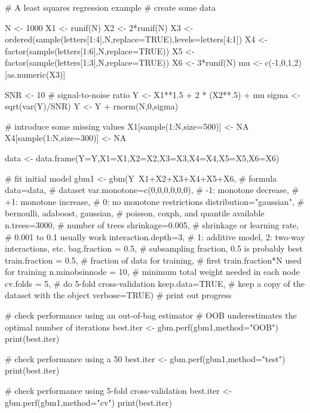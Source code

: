 \begin{Examples}
\begin{ExampleCode}
# A least squares regression example
# create some data

N <- 1000
X1 <- runif(N)
X2 <- 2*runif(N)
X3 <- ordered(sample(letters[1:4],N,replace=TRUE),levels=letters[4:1])
X4 <- factor(sample(letters[1:6],N,replace=TRUE))
X5 <- factor(sample(letters[1:3],N,replace=TRUE))
X6 <- 3*runif(N)
mu <- c(-1,0,1,2)[as.numeric(X3)]

SNR <- 10 # signal-to-noise ratio
Y <- X1**1.5 + 2 * (X2**.5) + mu
sigma <- sqrt(var(Y)/SNR)
Y <- Y + rnorm(N,0,sigma)

# introduce some missing values
X1[sample(1:N,size=500)] <- NA
X4[sample(1:N,size=300)] <- NA

data <- data.frame(Y=Y,X1=X1,X2=X2,X3=X3,X4=X4,X5=X5,X6=X6)

# fit initial model
gbm1 <- gbm(Y~X1+X2+X3+X4+X5+X6,         # formula
    data=data,                   # dataset
    var.monotone=c(0,0,0,0,0,0), # -1: monotone decrease,
                                 # +1: monotone increase,
                                 #  0: no monotone restrictions
    distribution="gaussian",     # bernoulli, adaboost, gaussian,
                                 # poisson, coxph, and quantile available
    n.trees=3000,                # number of trees
    shrinkage=0.005,             # shrinkage or learning rate,
                                 # 0.001 to 0.1 usually work
    interaction.depth=3,         # 1: additive model, 2: two-way interactions, etc.
    bag.fraction = 0.5,          # subsampling fraction, 0.5 is probably best
    train.fraction = 0.5,        # fraction of data for training,
                                 # first train.fraction*N used for training
    n.minobsinnode = 10,         # minimum total weight needed in each node
    cv.folds = 5,                # do 5-fold cross-validation
    keep.data=TRUE,              # keep a copy of the dataset with the object
    verbose=TRUE)                # print out progress

# check performance using an out-of-bag estimator
# OOB underestimates the optimal number of iterations
best.iter <- gbm.perf(gbm1,method="OOB")
print(best.iter)

# check performance using a 50%
best.iter <- gbm.perf(gbm1,method="test")
print(best.iter)

# check performance using 5-fold cross-validation
best.iter <- gbm.perf(gbm1,method="cv")
print(best.iter)


\end{ExampleCode}
\end{Examples}
